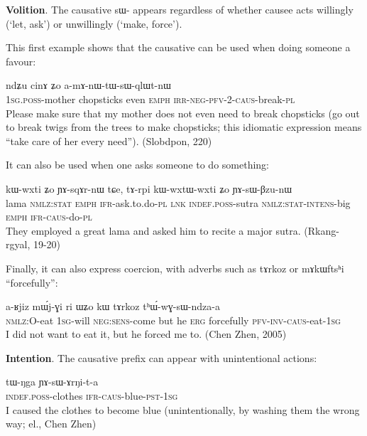 \documentclass[oldfontcommands,oneside,a4paper,11pt]{article}
\newcommand{\ipa}[1]{{\phon \mbox{#1}}} %
\newcommand{\sg}{\textsc{sg}}
\newcommand{\pl}{\textsc{pl}}
\newcommand{\pfv}{\textsc{pfv}}
\newcommand{\caus}{\textsc{caus}}
\newcommand{\lnk}{\textsc{lnk}}
\newcommand{\erg}{\textsc{erg}}
\newcommand{\emphat}{\textsc{emph}}
\newcommand{\evd}{\textsc{ifr}}
\newcommand{\intens}{\textsc{intens}}
\newcommand{\inv}{\textsc{inv}}
\newcommand{\irr}{\textsc{irr}}
\newcommand{\negat}{\textsc{neg}}
\newcommand{\nmlz}{\textsc{nmlz}}
\newcommand{\poss}{\textsc{poss}}
\newcommand{\pst}{\textsc{pst}}
\newcommand{\stat}{\textsc{stat}}
\begin{document}
 \textbf{Volition}. The causative \ipa{sɯ-} appears regardless of whether causee acts willingly (`let, ask') or unwillingly (`make, force').
 
 This first example shows that the causative can be used when doing someone a favour:
  \begin{exe}
\ex 
\gll   \ipa{a-mu} 	\ipa{ndʑu} 	\ipa{cinɤ}	\ipa{ʑo} 	\ipa{a-mɤ-nɯ-tɯ-sɯ-qlɯt-nɯ} \\
  1\sg{}.\poss{}-mother chopsticks even \emphat{} \irr{}-\negat{}-\pfv{}-2-\caus{}-break-\pl{} \\
 \glt    Please make sure that my mother does not even need to break chopsticks (go out to break twigs from the trees to make chopsticks; this idiomatic expression means ``take care of her every need''). (Slobdpon, 220)
\end{exe}

 It can also be used when one asks someone to do something:
 \begin{exe}
\ex 
\gll  \ipa{βlama} 	\ipa{kɯ-wxti} 	\ipa{ʑo} 	\ipa{ɲɤ-sqɤr-nɯ} 	\ipa{tɕe,} 	\ipa{tɤ-rpi} 	\ipa{kɯ-wxtɯ-wxti} 	\ipa{ʑo} 	\ipa{ɲɤ-sɯ-βzu-nɯ}  \\
lama \nmlz{}:\stat{} \emphat{} \evd{}-ask.to.do-\pl{} \lnk{}  \textsc{indef.poss}-sutra \nmlz{}:\stat{}-\intens{}-big \emphat{} \evd{}-\caus{}-do-\pl{} \\
 \glt   They employed a great lama and asked him to recite a major sutra. (Rkang-rgyal, 19-20)
\end{exe}

Finally, it can also express coercion, with adverbs such as \ipa{tɤrkoz} 	or \ipa{mɤkɯftsʰi} ``forcefully'':
 \begin{exe}
\ex 
\gll \ipa{kɤ-ndza} 	\ipa{a-ʁjiz} 	\ipa{mɯ́j-ɣi} 	\ipa{ri} 	\ipa{ɯʑo} 	\ipa{kɯ} 	\ipa{tɤrkoz} 	\ipa{tʰɯ́-wɣ-sɯ-ndza-a} \\
\nmlz{}:O-eat 1\sg{}-will \negat{}:\textsc{sens}-come but he \erg{} forcefully \pfv{}-\inv{}-\caus{}-eat-1\sg{} \\
 \glt   I did not want to eat it, but he forced me to. (Chen Zhen, 2005)
\end{exe}

 
   \textbf{Intention}. The causative prefix can appear with unintentional actions:
 \begin{exe}
\ex 
\gll 
\ipa{tɯ-ŋga} 	\ipa{ɲɤ-sɯ-ɤrŋi-t-a} \\
	 \textsc{indef.poss}-clothes \evd{}-\caus{}-blue-\pst{}-1\sg{} \\
 \glt   I caused the clothes to become blue (unintentionally, by washing them the wrong way; el., Chen Zhen)
\end{exe}
 
\end{document}
